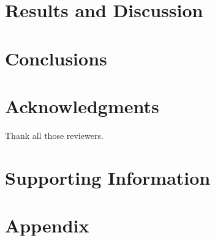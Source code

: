 \documentclass{article}
\begin{document}
\section{Results and Discussion}

\section{Conclusions}

\section{Acknowledgments}
Thank all those reviewers.

\section{Supporting Information}

\section{Appendix}


\end{document}
